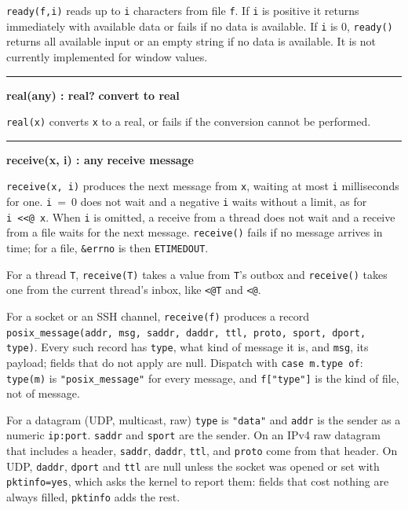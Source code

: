 \noindent
{}\texttt{ready(f,i)} reads up to \texttt{i} characters
from file \texttt{f}. If \texttt{i} is positive it returns immediately with available data or
fails if no data is available. If \texttt{i} is 0, \texttt{ready()}
returns all available input or an empty string if no data is available.
It is not currently implemented for window values.

\bigskip\hrule\vspace{0.1cm}
\noindent
{\bf real(any) : real? } \hfill {\bf convert to real}

\noindent
{}\texttt{real(x)} converts \texttt{x} to a real,
or fails if the conversion cannot be performed.

\bigskip\hrule\vspace{0.1cm}
\noindent
{\bf receive(x, i) : any } \hfill {\bf receive message}

\noindent
{}\texttt{receive(x, i)} produces the next message
from \texttt{x}, waiting at most \texttt{i} milliseconds for one.
\texttt{i}~=~0 does not wait and a negative \texttt{i} waits without a
limit, as for \texttt{i~<<@~x}. When \texttt{i} is omitted, a receive
from a thread does not wait and a receive from a file waits for the
next message. \texttt{receive()} fails if no message arrives in time;
for a file, \texttt{\&errno} is then \texttt{ETIMEDOUT}.

For a thread \texttt{T}, \texttt{receive(T)} takes a value from
\texttt{T}'s outbox and \texttt{receive()} takes one from the current
thread's inbox, like \texttt{<@T} and \texttt{<@}.

For a socket or an SSH channel, \texttt{receive(f)} produces a record
\texttt{posix\_message(addr, msg, saddr, daddr, ttl, proto, sport, dport, type)}.
Every such record has \texttt{type}, what kind of message it is, and
\texttt{msg}, its payload; fields that do not apply are null. Dispatch
with \texttt{case m.type of}: \texttt{type(m)} is
\texttt{"posix\_message"} for every message, and \texttt{f["type"]} is
the kind of file, not of message.

For a datagram (UDP, multicast, raw) \texttt{type} is \texttt{"data"}
and \texttt{addr} is the sender as a numeric \texttt{ip:port}.
\texttt{saddr} and \texttt{sport} are the sender. On an IPv4 raw
datagram that includes a header, \texttt{saddr}, \texttt{daddr},
\texttt{ttl}, and \texttt{proto} come from that header. On UDP,
\texttt{daddr}, \texttt{dport} and \texttt{ttl} are null unless the
socket was opened or set with \texttt{pktinfo=yes}, which asks the
kernel to report them: fields that cost nothing are always filled,
\texttt{pktinfo} adds the rest.

